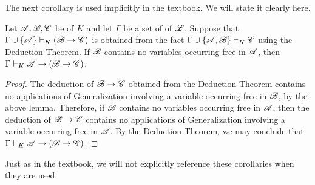 The next corollary is used implicitly in the textbook. We will state it clearly here.

\begin{corollary*}
  Let \(\mathscr{A}, \mathscr{B}, \mathscr{C}\) be \wfs{} of \(K\) and let \(\Gamma\) be a set of \wfs{} of \(\mathscr{L}\). Suppose that \(\Gamma \cup \{\mathscr{A}\} \vdash_{K} (\mathscr{B} \rightarrow \mathscr{C})\) is obtained from the fact \(\Gamma \cup \{\mathscr{A}, \mathscr{B}\} \vdash_{K} \mathscr{C}\) using the Deduction Theorem. If \(\mathscr{B}\) contains no variables occurring free in \(\mathscr{A}\), then \(\Gamma \vdash_{K} \mathscr{A} \rightarrow (\mathscr{B} \rightarrow \mathscr{C})\).

  \begin{proof}
    The deduction of \(\mathscr{B} \rightarrow \mathscr{C}\) obtained from the Deduction Theorem contains no applications of Generalization involving a variable occurring free in \(\mathscr{B}\), by the above lemma. Therefore, if \(\mathscr{B}\) contains no variables occurring free in \(\mathscr{A}\), then the deduction of \(\mathscr{B} \rightarrow \mathscr{C}\) contains no applications of Generalization involving a variable occurring free in \(\mathscr{A}\). By the Deduction Theorem, we may conclude that \(\Gamma \vdash_{K} \mathscr{A} \rightarrow (\mathscr{B} \rightarrow \mathscr{C})\).
  \end{proof}
\end{corollary*}

Just as in the textbook, we will not explicitly reference these corollaries when they are used.

\solutions{}

